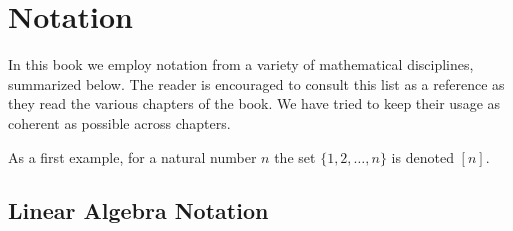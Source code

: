 \chapter*{Notation}\label{ch:notation}

In this book we employ notation from a variety of mathematical disciplines,
summarized below. The reader is encouraged to consult this list as a reference
as they read the various chapters of the book. We have tried to keep their usage
as coherent as possible across chapters.

As a first example, for a natural number \(n\) the set \(\{1, 2,
\dots, n\}\) is denoted \([n]\).

\section*{Linear Algebra Notation}
